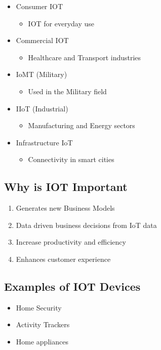 \documentclass[11pt]{article}
\begin{document}
\begin{itemize}
\item Consumer IOT
\begin{itemize}
\item IOT for everyday use
\end{itemize}
\item Commercial IOT
\begin{itemize}
\item Healthcare and Transport industries
\end{itemize}
\item IoMT (Military)
\begin{itemize}
\item Used in the Military field
\end{itemize}
\item IIoT (Industrial)
\begin{itemize}
\item Manufacturing and Energy sectors
\end{itemize}
\item Infrastructure IoT
\begin{itemize}
\item Connectivity in smart cities
\end{itemize}
\end{itemize}

\subsection{Why is IOT Important}
\label{sec:org78733d0}

\begin{enumerate}
\item Generates new Business Models
\item Data driven business decisions from IoT data
\item Increase productivity and efficiency
\item Enhances customer experience
\end{enumerate}

\subsection{Examples of IOT Devices}
\label{sec:orgbedac2b}

\begin{itemize}
\item Home Security
\item Activity Trackers
\item Home appliances
\end{itemize}
\end{document}
